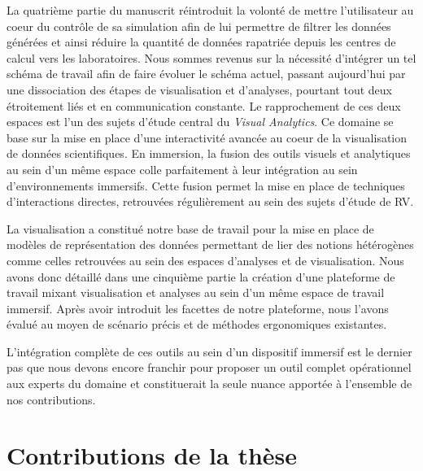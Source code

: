 
La quatrième partie du manuscrit réintroduit la volonté de mettre l'utilisateur au coeur du contrôle de sa simulation afin de lui permettre de filtrer les données générées et ainsi réduire la quantité de données rapatriée depuis les centres de calcul vers les laboratoires. Nous sommes revenus sur la nécessité d'intégrer un tel schéma de travail afin de faire évoluer le schéma actuel, passant aujourd'hui par une dissociation des étapes de visualisation et d'analyses, pourtant tout deux étroitement liés et en communication constante.
Le rapprochement de ces deux espaces est l'un des sujets d'étude central du \textit{Visual Analytics}. Ce domaine se base sur la mise en place d'une interactivité avancée au coeur de la visualisation de données scientifiques. 
En immersion, la fusion des outils visuels et analytiques au sein d'un même espace colle parfaitement à leur intégration au sein d'environnements immersifs. Cette fusion permet la mise en place de techniques d'interactions directes, retrouvées régulièrement au sein des sujets d'étude de RV.

La visualisation a constitué notre base de travail pour la mise en place de modèles de représentation des données permettant de lier des notions hétérogènes comme celles retrouvées au sein des espaces d'analyses et de visualisation. Nous avons donc détaillé dans une cinquième partie la création d'une plateforme de travail mixant visualisation et analyses au sein d'un même espace de travail immersif. Après avoir introduit les facettes de notre plateforme, nous l'avons évalué au moyen de scénario précis et de méthodes ergonomiques existantes.

L'intégration complète de ces outils au sein d'un dispositif immersif est le dernier pas que nous devons encore franchir pour proposer un outil complet opérationnel aux experts du domaine et constituerait la seule nuance apportée à l'ensemble de nos contributions.

\section*{Contributions de la thèse}







